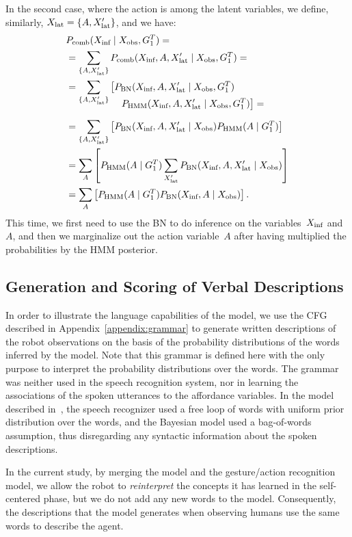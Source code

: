 In the second case, where the action is among the latent variables, we define, similarly, $X_\text{lat} = \{A, X_\text{lat}^\prime\}$, and we have:
\begin{align} \label{eq:fusion_including_action}
  & \pcomb(\xinf \given \xobs, G_1^T) = \nonumber \\
  &= \sum_{\{A,\xlat^\prime\}} \pcomb(\xinf, A, \xlat^\prime \given \xobs, G_1^T)= \nonumber \\
  &= \sum_{\{A,\xlat^\prime\}} \left[\pbn(\xinf, A, \xlat^\prime \given \xobs, G_1^T)\right. \nonumber \\[-4mm]
    & \mspace{100mu} \left.\phmm(\xinf, A, \xlat^\prime \given \xobs, G_1^T)\right]= \nonumber \\[2mm]
  &= \sum_{\{A,\xlat^\prime\}} \left[\pbn(\xinf, A, \xlat^\prime \given \xobs) \phmm(A \given G_1^T)\right] \nonumber \\
  &= \sum_{A}\left[\phmm(A \given G_1^T)\sum_{\xlat^\prime} \pbn(\xinf, A, \xlat^\prime \given \xobs)\right] \nonumber \\
  &= \sum_{A}\left[\phmm(A \given G_1^T) \pbn(\xinf, A \given \xobs)\right].
\end{align}
This time, we first need to use the \ac{BN} to do inference on the variables~$X_\text{inf}$ and~$A$, and then we marginalize out the action variable~$A$ after having multiplied the probabilities by the \ac{HMM} posterior.

\subsection{Generation and Scoring of Verbal Descriptions}
\label{sec:approach:verbal}

In order to illustrate the language capabilities of the model, we use the \ac{CFG} described in Appendix~\ref{appendix:grammar} to generate written descriptions of the robot observations on the basis of the probability distributions of the words inferred by the model.
Note that this grammar is defined here with the only purpose to interpret the probability distributions over the words.
The grammar was neither used in the speech recognition system, nor in learning the associations of the spoken utterances to the affordance variables.
In the model described in~\cite{salvi:2012:smcb}, the speech recognizer used a free loop of words with uniform prior distribution over the words, and the Bayesian model used a bag-of-words assumption, thus disregarding any syntactic information about the spoken descriptions.

In the current study, by merging the \AffWords{} model and the gesture/action recognition model, we allow the robot to \emph{reinterpret} the concepts it has learned in the self-centered phase, but we do not add any new words to the model.
Consequently, the descriptions that the model generates when observing humans use the same words to describe the agent.

